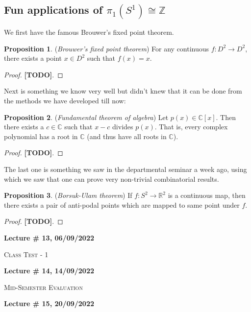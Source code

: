 \documentclass[letterpaper,11pt,twoside]{article}
\theoremstyle{definition}
\newtheorem{proposition}{Proposition}[subsection]
\theoremstyle{definition}
\theoremstyle{definition}
\theoremstyle{definition}
\theoremstyle{definition}
\theoremstyle{definition}
\theoremstyle{remark}
\theoremstyle{definition}
\newcommand{\isom}{\cong}
\newcommand{\R}[0]{\mathbb{R}}
\newcommand{\newlecture}[2]{\begin{center}
    \textbf{Lecture \# #1, #2}
\end{center}}
\newcommand{\Z}[0]{\mathbb{Z}}
\begin{document}
\subsection{Fun applications of $\pi_1(S^1) \isom \Z$}
We first have the famous Brouwer's fixed point theorem.
\begin{proposition}
(\textit{Brouwer's fixed point theorem}) For any continuous $f : D^2 \to D^2$, there exists a point $x\in D^2$ such that $f(x) = x$.
\end{proposition}
\begin{proof}
\textbf{[TODO]}.
\end{proof}
Next is something we know very well but didn't knew that it can be done from the methods we have developed till now:
\begin{proposition}
(\textit{Fundamental theorem of algebra}) Let $p(x) \in \mathbb{C}[x]$. Then there exists a $c\in \mathbb{C}$ such that $x-c$ divides $p(x)$. That is, every complex polynomial has a root in $\mathbb{C}$ (and thus have all roots in $\mathbb{C}$).
\end{proposition}
\begin{proof}
\textbf{[TODO]}.
\end{proof}
The last one is something we saw in the departmental seminar a week ago, using which we saw that one can prove very non-trivial combinatorial results.
\begin{proposition}
(\textit{Borsuk-Ulam theorem}) If $f : S^2 \to \R^2$ is a continuous map, then there exists a pair of anti-podal points which are mapped to same point under $f$.
\end{proposition}
\begin{proof}
\textbf{[TODO]}.
\end{proof}
\newlecture{13}{06/09/2022}
\begin{center}
    \scshape{{Class Test - 1}}
\end{center}
\newlecture{14}{14/09/2022}
\begin{center}
    \scshape{Mid-Semester Evaluation}
\end{center}
\newpage
\newlecture{15}{20/09/2022}
\end{document}
